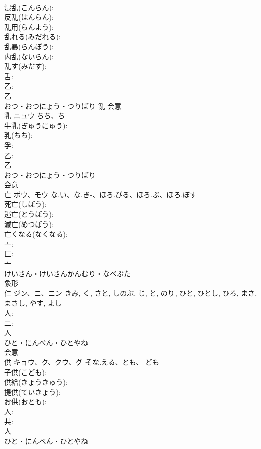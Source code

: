 \documentclass[8pt]{extreport}
\begin{document}
\begin{CJK}{UTF8}{min}
\\	混乱(こんらん): 
\\	反乱(はんらん): 
\\	乱用(らんよう): 
\\	乱れる(みだれる): 
\\	乱暴(らんぼう): 
\\	内乱(ないらん): 
\\	乱す(みだす): 
\\	舌: 
\\	乙: 
\\	乙	
\\	おつ・おつにょう・つりばり	亂	会意 
\\	乳	ニュウ	ちち、ち		
\\	牛乳(ぎゅうにゅう): 
\\	乳(ちち): 
\\	孚: 
\\	乙: 
\\	乙	
\\	おつ・おつにょう・つりばり	
\\	会意 
\\	亡	ボウ、モウ	な.い、な.き-、ほろ.びる、ほろ.ぶ、ほろ.ぼす		
\\	死亡(しぼう): 
\\	逃亡(とうぼう): 
\\	滅亡(めつぼう): 
\\	亡くなる(なくなる): 
\\	亠: 
\\	匚: 
\\	亠	
\\	けいさん・けいさんかんむり・なべぶた	
\\	象形 
\\	仁	ジン、ニ、ニン		きみ, く, さと, しのぶ, じ, と, のり, ひと, ひとし, ひろ, まさ, まさし, やす, よし	
\\	人: 
\\	二: 
\\	人	
\\	ひと・にんべん・ひとやね	
\\	会意 
\\	供	キョウ、ク、クウ、グ	そな.える、とも、-ども		
\\	子供(こども): 
\\	供給(きょうきゅう): 
\\	提供(ていきょう): 
\\	お供(おとも): 
\\	人: 
\\	共: 
\\	人	
\\	ひと・にんべん・ひとやね	

\end{CJK}
\end{document}
